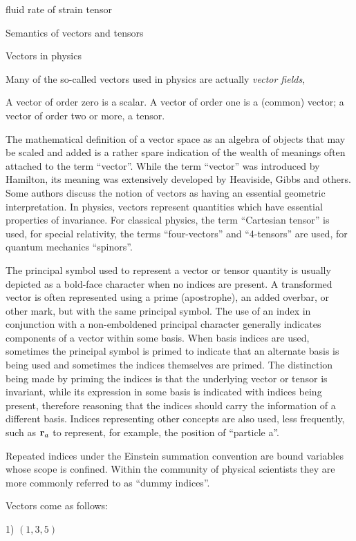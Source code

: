 \documentclass{llncs}
\begin{document}
fluid rate of strain tensor

Semantics of vectors and tensors

Vectors in physics

Many of the so-called vectors used in physics are actually {\em vector
fields},

A vector of order zero is a scalar.
A vector of order one is a (common) vector; a vector of order two or
more, a tensor.

The mathematical definition of a vector space as an algebra of
objects that may be scaled and added is a rather spare
indication of the wealth of meanings often attached to the term
``vector''.
While the term ``vector'' was introduced by Hamilton, its meaning was
extensively developed by Heaviside, Gibbs and others.
Some authors discuss the notion of vectors as having an essential
geometric interpretation.
In physics, vectors represent quantities which have essential
properties of invariance.
For classical physics, the term ``Cartesian tensor'' is used,
for special relativity, the terms ``four-vectors'' and ``4-tensors''
are used, for quantum mechanics ``spinors''.

The principal symbol used to represent a vector or tensor quantity is
usually depicted as a bold-face character when no indices are present.
A transformed vector is often represented using a prime (apostrophe),
an added overbar, or other mark, but with the same principal symbol.
The use of an index in conjunction with a non-emboldened principal
character generally indicates components of a vector within some
basis.
When basis indices are used, sometimes the principal symbol is primed
to indicate that an alternate basis is being used and sometimes the
indices themselves are primed.
The distinction being made by priming the indices is that the
underlying vector or tensor is invariant, while its expression in some
basis is indicated with indices being present, therefore reasoning
that the indices should carry the information of a different basis.  
Indices representing other concepts are also used, less frequently,
such as ${\bf r}_a$ to represent, for example, the position of
``particle a''.

Repeated indices under the Einstein summation convention are bound
variables whose scope is confined.
Within the community of physical scientists they are more commonly
referred to as ``dummy indices''.


Vectors come as follows:

1) $\left( 1, 3, 5 \right)$
\end{document}
